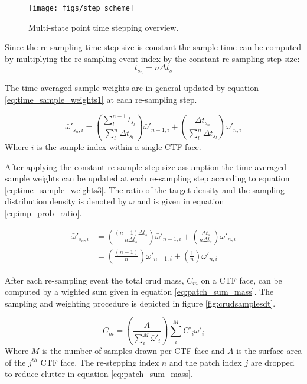 \begin{figure}[H]
    \centering
    \texttt{[image: figs/step\_scheme]}
    \caption{Multi-state point time stepping overview.}
    \label{fig:stepscheme}
\end{figure}

Since the re-sampling time step size is constant the sample time can be computed by multiplying the re-sampling event index by the constant re-sampling step size:
\begin{equation}
t_{s_n} = n\Delta t_s
\end{equation}

The time averaged sample weights are in general updated by equation \ref{eq:time_sample_weights1} at each re-sampling step.

\begin{equation}
\bar \omega'_{{s_n},i} = 
\left( \frac{\sum_{l}^{n-1}t_{s_l}}{\sum_l^n \Delta t_{s_l}} \right) \bar \omega'_{n-1,i} + 
\left( \frac{\Delta t_{s_n}}{\sum_l^n \Delta t_{s_l}} \right) \omega'_{n,i}
\label{eq:time_sample_weights1}
\end{equation}
Where $i$ is the sample index within a single CTF face.

After applying the constant re-sample step size assumption the time averaged sample weights can be updated at each re-sampling step according to equation \ref{eq:time_sample_weights3}.
The ratio of the target density and the sampling distribution density is denoted by $\omega$ and is given in equation \ref{eq:imp_prob_ratio}. 

\begin{align}
\bar \omega'_{{s_n},i} &= \left( \frac{(n-1) \Delta t_s}{n \Delta t_s} \right) \bar \omega'_{n-1,i} + \left( \frac{\Delta t_s}{n \Delta t_s} \right) \omega'_{n,i} \nonumber \\
 &= \left( \frac{(n-1)}{n} \right) \bar \omega'_{n-1,i} + \left( \frac{1}{n} \right) \omega'_{n,i}
\label{eq:time_sample_weights3}
\end{align}

After each re-sampling event the total crud mass, $C_m$ on a CTF face, can be computed by a wighted sum given in equation \ref{eq:patch_sum_mass}.  The sampling and weighting procedure is depicted in figure \ref{fig:crudsamplesdt}.

\begin{equation}
C_{m} = \left(\frac{A}{\sum_i^M \bar \omega'_i}\right) \sum_i^M C'_i \bar \omega'_i
\label{eq:patch_sum_mass}
\end{equation}
Where $M$ is the number of samples drawn per CTF face and $A$ is the surface area of the $j^{th}$ CTF face.  The re-stepping index $n$ and the patch index $j$ are dropped to reduce clutter in equation \ref{eq:patch_sum_mass}.

